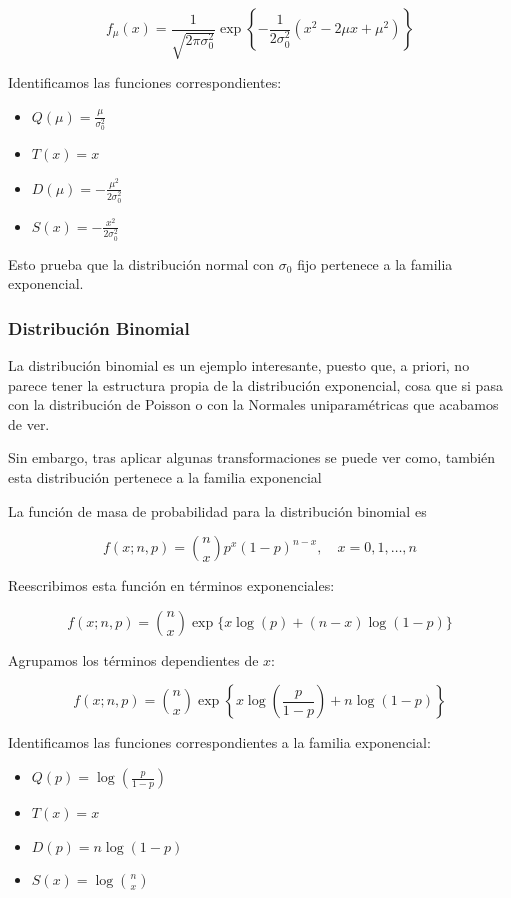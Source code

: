 \documentclass[
]{article}
\providecommand{\tightlist}{%
  \setlength{\itemsep}{0pt}\setlength{\parskip}{0pt}}
\begin{document}
\[f_{\mu}(x) = \frac{1}{\sqrt{2\pi\sigma_0^2}} \exp\left\{-\frac{1}{2\sigma_0^2}(x^2 - 2\mu x + \mu^2)\right\}\]

Identificamos las funciones correspondientes:

\begin{itemize}
\tightlist
\item
  \(Q(\mu) = \frac{\mu}{\sigma_0^2}\)
\item
  \(T(x) = x\)
\item
  \(D(\mu) = -\frac{\mu^2}{2\sigma_0^2}\)
\item
  \(S(x) = -\frac{x^2}{2\sigma_0^2}\)
\end{itemize}

Esto prueba que la distribución normal con \(\sigma_0\) fijo pertenece a la familia exponencial.

\subsubsection{Distribución Binomial}\label{distribuciuxf3n-binomial}

La distribución binomial es un ejemplo interesante, puesto que, a priori, no parece tener la estructura propia de la distribución exponencial, cosa que si pasa con la distribución de Poisson o con la Normales uniparamétricas que acabamos de ver.

Sin embargo, tras aplicar algunas transformaciones se puede ver como, también esta distribución pertenece a la familia exponencial

La función de masa de probabilidad para la distribución binomial es

\[f(x; n, p) = \binom{n}{x} p^x (1 - p)^{n - x}, \quad x = 0, 1, \dots, n\]

Reescribimos esta función en términos exponenciales:

\[f(x; n, p) = \binom{n}{x} \exp\{x \log(p) + (n - x) \log(1 - p)\}\]

Agrupamos los términos dependientes de \(x\):

\[f(x; n, p) = \binom{n}{x} \exp\left\{x \log\left(\frac{p}{1 - p}\right) + n \log(1 - p)\right\}\]

Identificamos las funciones correspondientes a la familia exponencial:

\begin{itemize}
\tightlist
\item
  \(Q(p) = \log\left(\frac{p}{1 - p}\right)\)
\item
  \(T(x) = x\)
\item
  \(D(p) = n \log(1 - p)\)
\item
  \(S(x) = \log \binom{n}{x}\)
\end{itemize}
\end{document}
